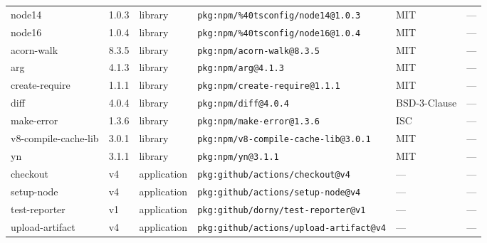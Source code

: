 \documentclass[11pt]{article}
\begin{document}
\begin{longtable}{|l|l|l|p{2.2cm}|l|p{4cm}|}
node14 & 1.0.3 & library & \texttt{pkg:npm/\%40tsconfig/node14@1.0.3} & MIT & — \\
node16 & 1.0.4 & library & \texttt{pkg:npm/\%40tsconfig/node16@1.0.4} & MIT & — \\
acorn-walk & 8.3.5 & library & \texttt{pkg:npm/acorn-walk@8.3.5} & MIT & — \\
arg & 4.1.3 & library & \texttt{pkg:npm/arg@4.1.3} & MIT & — \\
create-require & 1.1.1 & library & \texttt{pkg:npm/create-require@1.1.1} & MIT & — \\
diff & 4.0.4 & library & \texttt{pkg:npm/diff@4.0.4} & BSD-3-Clause & — \\
make-error & 1.3.6 & library & \texttt{pkg:npm/make-error@1.3.6} & ISC & — \\
v8-compile-cache-lib & 3.0.1 & library & \texttt{pkg:npm/v8-compile-cache-lib@3.0.1} & MIT & — \\
yn & 3.1.1 & library & \texttt{pkg:npm/yn@3.1.1} & MIT & — \\
checkout & v4 & application & \texttt{pkg:github/actions/checkout@v4} & — & — \\
setup-node & v4 & application & \texttt{pkg:github/actions/setup-node@v4} & — & — \\
test-reporter & v1 & application & \texttt{pkg:github/dorny/test-reporter@v1} & — & — \\
upload-artifact & v4 & application & \texttt{pkg:github/actions/upload-artifact@v4} & — & — \\
\hline
\end{longtable}
\end{document}
